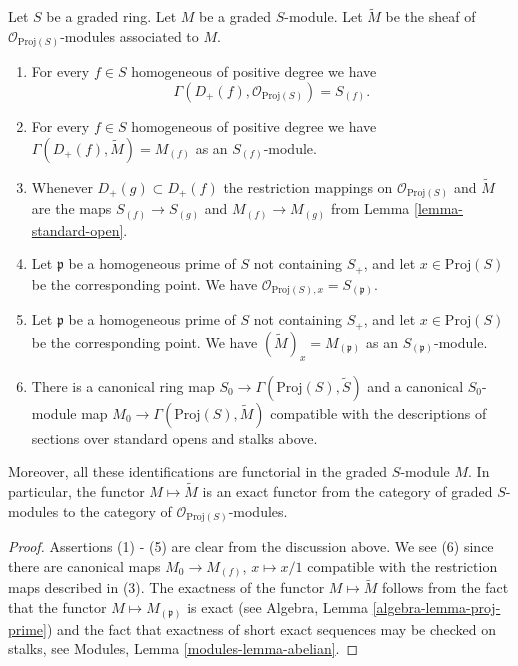 \begin{lemma}
\label{lemma-proj-sheaves}
Let $S$ be a graded ring. Let $M$ be a graded $S$-module.
Let $\widetilde M$ be the sheaf of $\mathcal{O}_{\text{Proj}(S)}$-modules
associated to $M$.
\begin{enumerate}
\item For every $f \in S$ homogeneous of positive degree we have
$$
\Gamma(D_{+}(f), \mathcal{O}_{\text{Proj}(S)}) = S_{(f)}.
$$
\item For every $f\in S$ homogeneous of positive degree
we have $\Gamma(D_{+}(f), \widetilde M) = M_{(f)}$
as an $S_{(f)}$-module.
\item Whenever $D_{+}(g) \subset D_{+}(f)$ the restriction mappings
on $\mathcal{O}_{\text{Proj}(S)}$ and $\widetilde M$
are the maps
$S_{(f)} \to S_{(g)}$ and $M_{(f)} \to M_{(g)}$ from Lemma
\ref{lemma-standard-open}.
\item Let $\mathfrak p$ be a homogeneous prime of $S$ not containing
$S_{+}$, and let $x \in \text{Proj}(S)$
be the corresponding point. We have
$\mathcal{O}_{\text{Proj}(S), x} = S_{(\mathfrak p)}$.
\item Let $\mathfrak p$ be a homogeneous prime of $S$ not containing
$S_{+}$, and let $x \in \text{Proj}(S)$
be the corresponding point. We have $(\widetilde M)_x = M_{(\mathfrak p)}$
as an $S_{(\mathfrak p)}$-module.
\item
\label{item-map}
There is a canonical ring map
$
S_0 \longrightarrow \Gamma(\text{Proj}(S), \widetilde S)
$
and a canonical $S_0$-module map
$
M_0 \longrightarrow \Gamma(\text{Proj}(S), \widetilde M)
$
compatible with the descriptions of sections over standard opens
and stalks above.
\end{enumerate}
Moreover, all these identifications are functorial in the graded
$S$-module $M$. In particular, the functor $M \mapsto \widetilde M$
is an exact functor from the category of graded $S$-modules
to the category of $\mathcal{O}_{\text{Proj}(S)}$-modules.
\end{lemma}

\begin{proof}
Assertions (1) - (5) are clear from the discussion above.
We see (6) since there are canonical maps $M_0 \to M_{(f)}$,
$x \mapsto x/1$ compatible with the restriction maps
described in (3). The exactness of the functor $M \mapsto \widetilde M$
follows from the fact that the functor $M \mapsto M_{(\mathfrak p)}$
is exact (see Algebra, Lemma \ref{algebra-lemma-proj-prime})
and the fact that exactness of short exact sequences
may be checked on stalks, see
Modules, Lemma \ref{modules-lemma-abelian}.
\end{proof}
